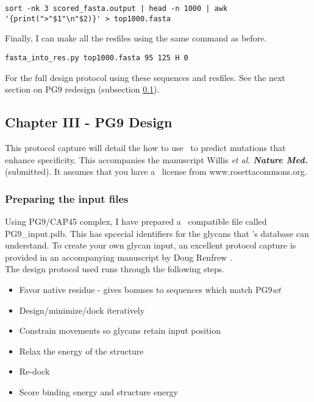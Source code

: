 \begin{lstlisting}[breaklines=true]
sort -nk 3 scored_fasta.output | head -n 1000 | awk '{print(">"$1"\n"$2)}' > top1000.fasta
\end{lstlisting}

Finally, I can make all the resfiles using the same command as before.

\begin{lstlisting}[breaklines=true]
fasta_into_res.py top1000.fasta 95 125 H 0
\end{lstlisting}

For the full design protocol using these sequences and resfiles. See the next section on PG9 redesign (subsection \ref{subsec:pg9redesign}).

\subsection{Chapter III - PG9 Design}
\label{subsec:pg9redesign}
\setlength{\parindent}{0cm}
This protocol capture will detail the how to use \rosettadesign~to predict mutations that enhance specificity. This accompanies the manuscript Willis \textit{et al.} \textbf{\textit{Nature Med.}} (submitted). It assumes that you have a \rosetta~license from www.rosettacommons.org. \\

\subsubsection{Preparing the input files}
Using PG9/CAP45 complex, I have prepared a \rosetta~compatible file called PG9\_input.pdb. This has spcecial identifiers for the glycans that \rosetta 's database can understand. To create your own glycan input, an excellent protocol capture is provided in an accompanying manuscript by Doug Renfrew \citep{Renfrew:2012ci}. \\

The design protocol used runs through the following steps.

\begin{itemize}
\item Favor native residue - gives bonuses to sequences which match PG9\textit{wt}
\item Design/minimize/dock iteratively
\item Constrain movements so glycans retain input position
\item Relax the energy of the structure
\item Re-dock
\item Score binding energy and structure energy
\end{itemize}

